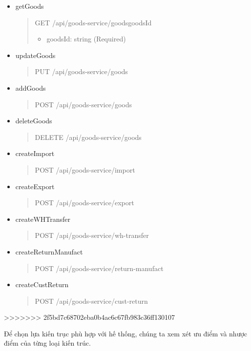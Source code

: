\begin{itemize}
	\item getGoods
	\begin{quote}
		GET /api/goods-service/goods{goodsId}
		\begin{itemize}
			\item goodsId: string (Required)
		\end{itemize}
	\end{quote}

	\item updateGoods
	\begin{quote}
		PUT /api/goods-service/goods
	\end{quote}

	\item addGoods
	\begin{quote}
		POST /api/goods-service/goods
	\end{quote}

	\item deleteGoods
	\begin{quote}
		DELETE /api/goods-service/goods
	\end{quote}

	\item createImport
	\begin{quote}
		POST /api/goods-service/import
	\end{quote}

	\item createExport
	\begin{quote}
		POST /api/goods-service/export
	\end{quote}

	\item createWHTransfer
	\begin{quote}
		POST /api/goods-service/wh-transfer
	\end{quote}

	\item createReturnManufact	
	\begin{quote}
		POST /api/goods-service/return-manufact
	\end{quote}

	\item createCustReturn
	\begin{quote}
		POST /api/goods-service/cust-return
	\end{quote}
\end{itemize}
>>>>>>> 2f5bd7c68702eba0b4ac6c67fb983c36ff130107

Để chọn lựa kiến trục phù hợp với hế thống, chúng ta xem xét ưu điểm và nhược điểm của từng loại kiến trúc.\\


